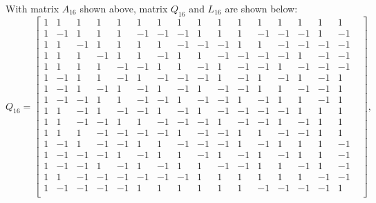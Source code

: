 \documentclass[11pt]{article}
\begin{document}
With matrix $A_{16}$ shown above, matrix $Q_{16}$ and $L_{16}$ are shown below:
$$Q_{16}=
\left[\begin{smallmatrix}
    1 & 1 & 1 & 1 & 1 & 1 & 1 & 1 & 1 & 1 & 1 & 1 & 1 & 1 & 1 & 1 &  \\
    1 & -1 & 1 & 1 & 1 & -1 & -1 & -1 & 1 & 1 & 1 & -1 & -1 & -1 & 1 & -1 \\
    1 & 1 & -1 & 1 & 1 & 1 & 1 & -1 & -1 & -1 & 1 & 1 & -1 & -1 & -1 & -1 \\
    1 & 1 & 1 & -1 & 1 & 1 & -1 & 1 & 1 & -1 & -1 & -1 & -1 & 1 & -1 & -1 \\
    1 & 1 & 1 & 1 & -1 & -1 & 1 & 1 & -1 & 1 & -1 & -1 & 1 & -1 & -1 & -1 \\
    1 & -1 & 1 & 1 & -1 & 1 & -1 & -1 & -1 & 1 & -1 & 1 & -1 & 1 & -1 & 1 \\
    1 & -1 & 1 & -1 & 1 & -1 & 1 & -1 & 1 & -1 & -1 & 1 & 1 & -1 & -1 & 1 \\
    1 & -1 & -1 & 1 & 1 & -1 & -1 & 1 & -1 & -1 & 1 & -1 & 1 & 1 & -1 & 1 \\
    1 & 1 & -1 & 1 & -1 & -1 & 1 & -1 & 1 & -1 & -1 & -1 & -1 & 1 & 1 & 1 \\
    1 & 1 & -1 & -1 & 1 & 1 & -1 & -1 & -1 & 1 & -1 & -1 & 1 & -1 & 1 & 1 \\
    1 & 1 & 1 & -1 & -1 & -1 & -1 & 1 & -1 & -1 & 1 & 1 & -1 & -1 & 1 & 1 \\
    1 & -1 & 1 & -1 & -1 & 1 & 1 & -1 & -1 & -1 & 1 & -1 & 1 & 1 & 1 & -1 \\
    1 & -1 & -1 & -1 & 1 & -1 & 1 & 1 & -1 & 1 & -1 & 1 & -1 & 1 & 1 & -1 \\
    1 & -1 & -1 & 1 & -1 & 1 & -1 & 1 & 1 & -1 & -1 & 1 & 1 & -1 & 1 & -1 \\
    1 & 1 & -1 & -1 & -1 & -1 & -1 & -1 & 1 & 1 & 1 & 1 & 1 & 1 & -1 & -1 \\
    1 & -1 & -1 & -1 & -1 & 1 & 1 & 1 & 1 & 1 & 1 & -1 & -1 & -1 & -1 & 1 \\
\end{smallmatrix}\right],
$$
\end{document}
